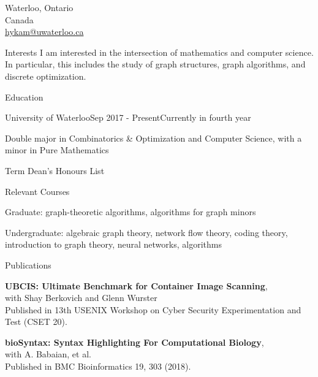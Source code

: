\documentclass{cv}
\begin{document}

Waterloo, Ontario \\
Canada \\
\href{hykam@uwaterloo.ca}{hykam@uwaterloo.ca}

\begin{rSection}{Interests}
	I am interested in the intersection of mathematics and computer science. In particular, this includes the study of graph structures, graph algorithms, and discrete optimization.
\end{rSection}

\begin{rSection}{Education}
\begin{rSubsection}{University of Waterloo}{Sep 2017 - Present}{Currently in fourth year}{}
	\item Double major in Combinatorics \& Optimization and Computer Science, with a minor in Pure Mathematics
	\item Term Dean's Honours List
\end{rSubsection}

\begin{rSubsection}{Relevant Courses}{}{}{}
	\item Graduate: graph-theoretic algorithms, algorithms for graph minors
	\item Undergraduate: algebraic graph theory, network flow theory, coding theory, introduction to graph theory, neural networks, algorithms
\end{rSubsection}
\end{rSection}

\begin{rSection}{Publications}
\begin{rSubsectionPure}
	\item \textbf{{UBCIS}: Ultimate Benchmark for Container Image Scanning}, \\
	with Shay Berkovich and Glenn Wurster \\
	Published in 13th {USENIX} Workshop on Cyber Security Experimentation and Test ({CSET} 20). 
\end{rSubsectionPure}

\begin{rSubsectionPure}
	\item \textbf{bioSyntax: Syntax Highlighting For Computational Biology}, \\
	with A. Babaian, et al. \\
	Published in BMC Bioinformatics 19, 303 (2018). 
\end{rSubsectionPure}
\end{rSection}
\end{document}
